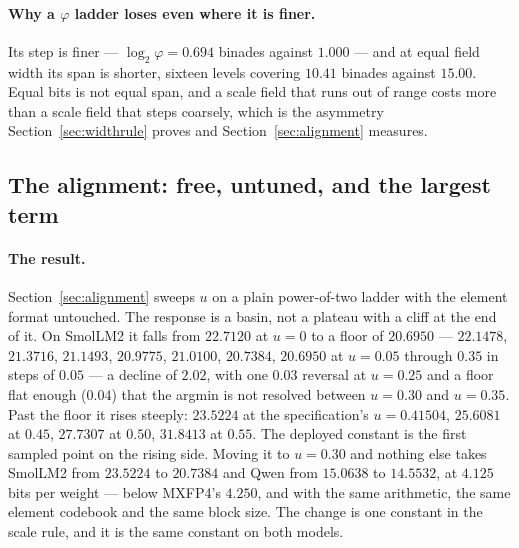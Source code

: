 \documentclass[11pt]{article}
\theoremstyle{definition}
\begin{document}
\paragraph{Why a $\varphi$ ladder loses even where it is finer.} Its step is
finer --- $\log_{2}\varphi = 0.694$ binades against $1.000$ --- and at equal
field width its span is shorter, sixteen levels covering $10.41$ binades
against $15.00$. Equal bits is not equal span, and a scale field that runs out
of range costs more than a scale field that steps coarsely, which is the
asymmetry Section~\ref{sec:widthrule} proves and Section~\ref{sec:alignment}
measures.

\subsection*{The alignment: free, untuned, and the largest term}

\paragraph{The result.} Section~\ref{sec:alignment} sweeps $u$ on a plain
power-of-two ladder with the element format untouched. The response is a basin,
not a plateau with a cliff at the end of it. On SmolLM2 it falls from $22.7120$
at $u=0$ to a floor of $20.6950$ --- $22.1478$, $21.3716$, $21.1493$,
$20.9775$, $21.0100$, $20.7384$, $20.6950$ at $u=0.05$ through $0.35$ in steps
of $0.05$ --- a decline of $2.02$, with one $0.03$ reversal at $u=0.25$ and a
floor flat enough ($0.04$) that the argmin is not resolved between $u=0.30$ and
$u=0.35$. Past the floor it rises steeply: $23.5224$ at the specification's
$u = 0.41504$, $25.6081$ at $0.45$, $27.7307$ at $0.50$, $31.8413$ at $0.55$.
The deployed constant is the first sampled point on the rising side. Moving it
to $u=0.30$ and nothing else takes SmolLM2 from $23.5224$ to $20.7384$ and Qwen
from $15.0638$ to $14.5532$, at $4.125$ bits per weight --- below MXFP4's
$4.250$, and with the same arithmetic, the same element codebook and the same
block size. The change is one constant in the scale rule, and it is the same
constant on both models.
\end{document}
